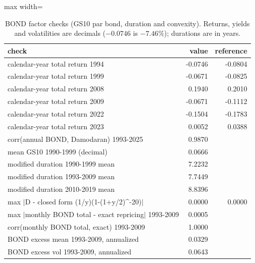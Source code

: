 \begin{table}[H]
\centering\small
\caption{BOND factor checks (GS10 par bond, duration and convexity). Returns, yields and volatilities are decimals ($-0.0746$ is $-7.46$\%); durations are in years.}
\label{tab:m8_bond}
\begin{adjustbox}{max width=\linewidth}
\begin{tabular}{lrr}
\toprule
check & value & reference \\
\midrule
calendar-year total return 1994 & -0.0746 & -0.0804 \\
calendar-year total return 1999 & -0.0671 & -0.0825 \\
calendar-year total return 2008 & 0.1940 & 0.2010 \\
calendar-year total return 2009 & -0.0671 & -0.1112 \\
calendar-year total return 2022 & -0.1504 & -0.1783 \\
calendar-year total return 2023 & 0.0052 & 0.0388 \\
corr(annual BOND, Damodaran) 1993-2025 & 0.9870 &  \\
mean GS10 1990-1999 (decimal) & 0.0666 &  \\
modified duration 1990-1999 mean & 7.2232 &  \\
modified duration 1993-2009 mean & 7.7449 &  \\
modified duration 2010-2019 mean & 8.8396 &  \\
max $|$D - closed form (1/y)(1-(1+y/2)\^{}-20)$|$ & 0.0000 & 0.0000 \\
max $|$monthly BOND total - exact repricing$|$ 1993-2009 & 0.0005 &  \\
corr(monthly BOND total, exact) 1993-2009 & 1.0000 &  \\
BOND excess mean 1993-2009, annualized & 0.0329 &  \\
BOND excess vol 1993-2009, annualized & 0.0643 &  \\
\bottomrule
\end{tabular}
\end{adjustbox}
\end{table}
